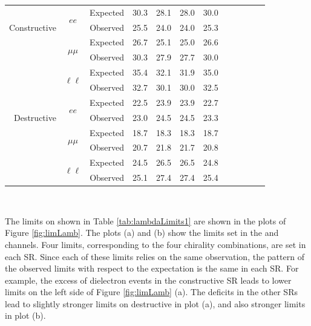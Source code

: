 {\begin{minipage}{\textwidth}
\begin{center}
{\begin{tabular}{r c c c c c c c c c c c}
\midrule
\multirow{3}{*}[-1.5em]{\begin{sideways}Constructive\end{sideways}} & \multirow{2}{*}{$ee$} & Expected & 30.3 & 28.1 & 28.0 & 30.0 \\
& & Observed & 25.5 & 24.0 & 24.0 & 25.3 \\
\cmidrule{2-7}
 & \multirow{2}{*}{$\mu\mu$} & Expected & 26.7 & 25.1 & 25.0 & 26.6 \\
& & Observed & 30.3 & 27.9 & 27.7 & 30.0 \\
\cmidrule{2-7}
 & \multirow{2}{*}{$\ell\ell$} & Expected & 35.4 & 32.1 & 31.9 & 35.0 \\
& & Observed & 32.7 & 30.1 & 30.0 & 32.5 \\
\midrule
\multirow{3}{*}[-1.5em]{\begin{sideways}Destructive\end{sideways}} & \multirow{2}{*}{$ee$} & Expected & 22.5 & 23.9 & 23.9 & 22.7 \\
& & Observed & 23.0 & 24.5 & 24.5 & 23.3 \\
\cmidrule{2-7}
 & \multirow{2}{*}{$\mu\mu$} & Expected & 18.7 & 18.3 & 18.3 & 18.7 \\
& & Observed & 20.7 & 21.8 & 21.7 & 20.8 \\
\cmidrule{2-7}
 & \multirow{2}{*}{$\ell\ell$} & Expected & 24.5 & 26.5 & 26.5 & 24.8 \\
& & Observed & 25.1 & 27.4 & 27.4 & 25.4 \\
\bottomrule\end{tabular}} \\
\end{center}
\end{minipage}
\clearpage
}

The limits on \lam shown in Table \ref{tab:lambdaLimits1} are shown in the plots of Figure \ref{fig:limLamb}.
The plots (a) and (b) show the limits set in the \ee and \mm channels.
Four limits, corresponding to the four chirality combinations, are set in each SR.
Since each of these limits relies on the same observation, the pattern of the observed limits with respect to the expectation is the same in each SR.
For example, the excess of dielectron events in the \ee constructive SR leads to lower limits on the left side of Figure \ref{fig:limLamb} (a).
The deficits in the other SRs lead to slightly stronger limits on destructive \lam in plot (a), and also stronger \mm limits in plot (b).

